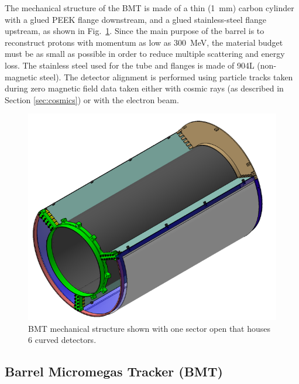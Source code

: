 The mechanical structure of the BMT is made of a thin (1~mm) carbon cylinder with a glued PEEK flange downstream, and a
glued stainless-steel flange upstream, as shown in Fig.~\ref{fig:mm-fig3}. Since the main purpose of the barrel is to
reconstruct protons with momentum as low as 300~MeV, the material budget must be as small as possible in order to reduce
multiple scattering and energy loss. The stainless steel used for the tube and flanges is made of 904L (non-magnetic steel).
The detector alignment is performed using particle tracks taken during zero magnetic field data taken either with cosmic
rays (as described in Section \ref{sec:cosmics}) or with the electron beam.

\begin{figure}[htb]
 \includegraphics[width=1.0\columnwidth,keepaspectratio]{images/fig3}
 \caption{BMT mechanical structure shown with one sector open that houses 6 curved detectors.}
 \label{fig:mm-fig3}
\end{figure}

\subsection{Barrel Micromegas Tracker (BMT)}

